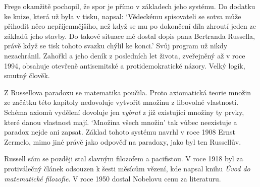 Frege okamžitě pochopil, že spor je přímo v základech jeho systému. Do dodatku ke knize, která už byla v tisku, napsal: `Vědeckému spisovateli se sotva může přihodit něco nepříjemnějšího, než když se mu po dokončení díla zhroutí jeden ze základů jeho stavby. Do takové situace mě dostal dopis pana Bertranda Russella, právě když se tisk tohoto svazku chýlil ke konci.' Svůj program už nikdy nezachránil. Zahořkl a jeho deník z posledních let života, zveřejněný až v roce 1994, obsahuje otevřeně antisemitské a protidemokratické názory. Velký logik, smutný člověk.

Z Russellova paradoxu se matematika poučila. Proto axiomatická teorie množin ze začátku této kapitoly nedovoluje vytvořit množinu z libovolné vlastnosti. Schéma axiomů vydělení dovoluje jen \textit{vybrat} z již existující množiny ty prvky, které danou vlastnost mají. `Množina všech množin' tak vůbec neexistuje a paradox nejde ani zapsat. Základ tohoto systému navrhl v roce 1908 Ernst Zermelo, mimo jiné právě jako odpověď na paradoxy, jako byl ten Russellův.

Russell sám se později stal slavným filozofem a pacifistou. V roce 1918 byl za protiválečný článek odsouzen k šesti měsícům vězení, kde napsal knihu \textit{Úvod do matematické filozofie}. V roce 1950 dostal Nobelovu cenu za literaturu.
